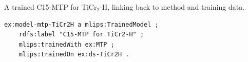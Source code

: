 A trained C15-MTP for TiCr$_2$-H, linking back to method and training data.
\begin{lstlisting}[language=turtle]
ex:model-mtp-TiCr2H a mlips:TrainedModel ;
    rdfs:label "C15-MTP for TiCr2-H" ;
    mlips:trainedWith ex:MTP ;
    mlips:trainedOn ex:ds-TiCr2H .
\end{lstlisting}
